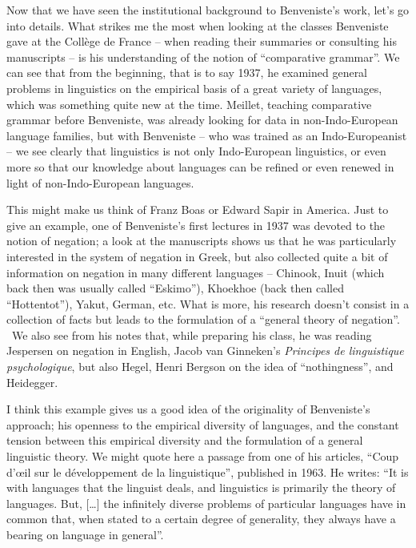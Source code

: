 \documentclass[12pt]{article}
\newenvironment{styleStandard}{\setlength\leftskip{0cm}\setlength\rightskip{0cm plus 1fil}\setlength\parindent{0cm}\setlength\parfillskip{0pt plus 1fil}\setlength\parskip{0in plus 1pt}\writerlistparindent\writerlistleftskip\leavevmode\normalfont\normalsize\writerlistlabel\ignorespaces}{\unskip\vspace{0in plus 1pt}\par}
\newcommand\writerlistleftskip{}
\newcommand\writerlistparindent{}
\newcommand\writerlistlabel{}
\begin{document}
\begin{styleStandard}
Now that we have seen the institutional background to Benveniste’s work, let’s go into details. What strikes me the most when looking at the classes Benveniste gave at the Collège de France – when reading their summaries or consulting his manuscripts – is his understanding of the notion of “comparative grammar”. We can see that from the beginning, that is to say 1937, he examined general problems in linguistics on the empirical basis of a great variety of languages, which was something quite new at the time. Meillet, teaching comparative grammar before Benveniste, was already looking for data in non-Indo-European language families, but with Benveniste – who was trained as an Indo-Europeanist – we see clearly that linguistics is not only Indo-European linguistics, or even more so that our knowledge about languages can be refined or even renewed in light of non-Indo-European languages. 
\end{styleStandard}

\begin{styleStandard}
This might make us think of Franz Boas or Edward Sapir in America. Just to give an example, one of Benveniste’s first lectures in 1937 was devoted to the notion of negation; a look at the manuscripts shows us that he was particularly interested in the system of negation in Greek, but also collected quite a bit of information on negation in many different languages – Chinook, Inuit (which back then was usually called “Eskimo”), Khoekhoe (back then called “Hottentot”), Yakut, German, etc. What is more, his research doesn’t consist in a collection of facts but leads to the formulation of a “general theory of negation”. \ We also see from his notes that, while preparing his class, he was reading Jespersen on negation in English, Jacob van Ginneken’s \textit{Principes de linguistique psychologique}, but also Hegel, Henri Bergson on the idea of “nothingness”, and Heidegger.
\end{styleStandard}

\begin{styleStandard}
I think this example gives us a good idea of the originality of Benveniste’s approach; his openness to the empirical diversity of languages, and the constant tension between this empirical diversity and the formulation of a general linguistic theory. We might quote here a passage from one of his articles, “Coup d’œil sur le développement de la linguistique”, published in 1963. He writes: “It is with languages that the linguist deals, and linguistics is primarily the theory of languages. But, […] the infinitely diverse problems of particular languages have in common that, when stated to a certain degree of generality, they always have a bearing on language in general”. 
\end{styleStandard}
\end{document}
